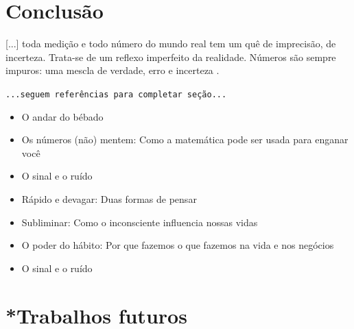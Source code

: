 \documentclass[
	article,			        %
	11pt,				          %
	oneside,			        %
	a4paper,			        %
	english,			        %
	brazil,				        %
	sumario=tradicional
]{abntex2}\usepackage[]{graphicx}\usepackage[]{color}
\begin{document}
% 

\section{Conclusão}

\begin{citacao}

[...] toda medição e todo número do mundo real tem um quê de imprecisão, de incerteza. Trata-se de um reflexo imperfeito da realidade. Números são sempre impuros: uma mescla de verdade, erro e incerteza \cite{Seife.2012}.

\end{citacao}


  \texttt{\color{red}...seguem referências para completar seção...}
  \begin{itemize}
  
  \nocite{Schleip2010}
  
    \item O andar do bébado \cite{Mlodinow.2009}
    \item Os n\'umeros (não) mentem: Como a matemática pode ser usada para enganar você \cite{Seife.2012}
    \item O sinal e o ruído \cite{Nate.2012}
    \item R{á}pido e devagar: Duas formas de pensar \cite{Kahneman.2012}
    \item Subliminar: Como o inconsciente influencia nossas vidas \cite{Mlodinow.2013}
    \item O poder do h{á}bito: Por que fazemos o que fazemos na vida e nos neg{ó}cios \cite{Duhigg.2012}
    \item O sinal e o ruído \cite{Nate.2012}
  \end{itemize}

\section{*Trabalhos futuros}
\end{document}

